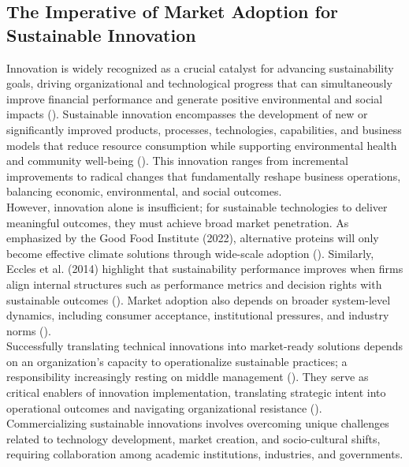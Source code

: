 	\subsection{The Imperative of Market Adoption for Sustainable Innovation}
	Innovation is widely recognized as a crucial catalyst for advancing sustainability goals, driving organizational and technological progress that can simultaneously improve financial performance and generate positive environmental and social impacts (\textcite{Boons2013, Schiederig2012}). Sustainable innovation encompasses the development of new or significantly improved products, processes, technologies, capabilities, and business models that reduce resource consumption while supporting environmental health and community well-being (\textcite{Adams2016}). This innovation ranges from incremental improvements to radical changes that fundamentally reshape business operations, balancing economic, environmental, and social outcomes. \\ 
	
	However, innovation alone is insufficient; for sustainable technologies to deliver meaningful outcomes, they must achieve broad market penetration. As emphasized by the Good Food Institute (2022), alternative proteins will only become effective climate solutions through wide-scale adoption (\textcite{GFI2022}). Similarly, Eccles et al. (2014) highlight that sustainability performance improves when firms align internal structures such as performance metrics and decision rights with sustainable outcomes (\textcite{Eccles2014}). Market adoption also depends on broader system-level dynamics, including consumer acceptance, institutional pressures, and industry norms (\textcite{Hall2003, Geels2002}). \\
	
	Successfully translating technical innovations into market-ready solutions depends on an organization’s capacity to operationalize sustainable practices; a responsibility increasingly resting on middle management (\textcite{Rafaeli2022}). They serve as critical enablers of innovation implementation, translating strategic intent into operational outcomes and navigating organizational resistance (\textcite{birkinshaw2004}). Commercializing sustainable innovations involves overcoming unique challenges related to technology development, market creation, and socio-cultural shifts, requiring collaboration among academic institutions, industries, and governments. \\
	
